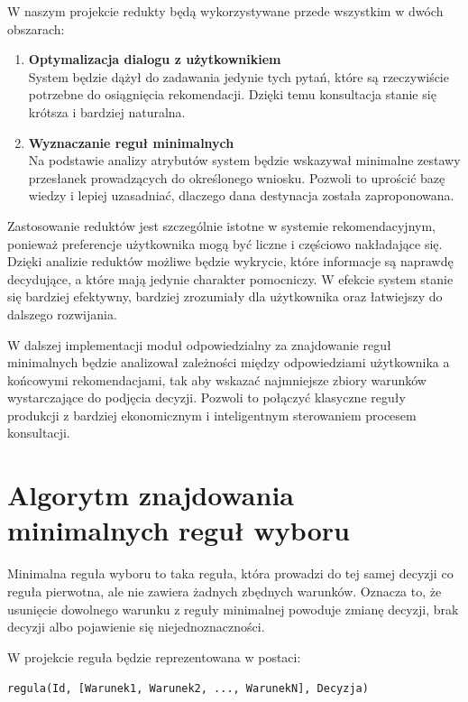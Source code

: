 \documentclass[12pt,a4paper]{article}
\begin{document}
W naszym projekcie redukty będą wykorzystywane przede wszystkim w dwóch obszarach:
\begin{enumerate}
    \item \textbf{Optymalizacja dialogu z użytkownikiem} \\
    System będzie dążył do zadawania jedynie tych pytań, które są rzeczywiście potrzebne do osiągnięcia rekomendacji. Dzięki temu konsultacja stanie się krótsza i bardziej naturalna.

    \item \textbf{Wyznaczanie reguł minimalnych} \\
    Na podstawie analizy atrybutów system będzie wskazywał minimalne zestawy przesłanek prowadzących do określonego wniosku. Pozwoli to uprościć bazę wiedzy i lepiej uzasadniać, dlaczego dana destynacja została zaproponowana.
\end{enumerate}

Zastosowanie reduktów jest szczególnie istotne w systemie rekomendacyjnym, ponieważ preferencje użytkownika mogą być liczne i częściowo nakładające się. Dzięki analizie reduktów możliwe będzie wykrycie, które informacje są naprawdę decydujące, a które mają jedynie charakter pomocniczy. W efekcie system stanie się bardziej efektywny, bardziej zrozumiały dla użytkownika oraz łatwiejszy do dalszego rozwijania.

W dalszej implementacji moduł odpowiedzialny za znajdowanie reguł minimalnych będzie analizował zależności między odpowiedziami użytkownika a końcowymi rekomendacjami, tak aby wskazać najmniejsze zbiory warunków wystarczające do podjęcia decyzji. Pozwoli to połączyć klasyczne reguły produkcji z bardziej ekonomicznym i inteligentnym sterowaniem procesem konsultacji.

\vspace{2cm}
\section{Algorytm znajdowania minimalnych reguł wyboru}

Minimalna reguła wyboru to taka reguła, która prowadzi do tej samej decyzji co reguła pierwotna, ale nie zawiera żadnych zbędnych warunków. Oznacza to, że usunięcie dowolnego warunku z reguły minimalnej powoduje zmianę decyzji, brak decyzji albo pojawienie się niejednoznaczności.

W projekcie reguła będzie reprezentowana w postaci:

\begin{center}
\texttt{regula(Id, [Warunek1, Warunek2, ..., WarunekN], Decyzja)}
\end{center}
\end{document}
